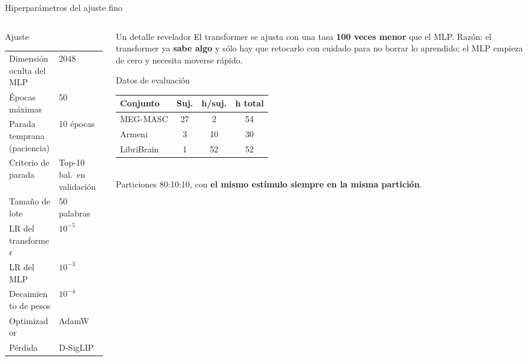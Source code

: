 \documentclass[aspectratio=169,10pt]{beamer}
\newcommand{\term}[1]{\textbf{\color{deepgreen}#1}}
\begin{document}
\begin{frame}[c]{Hiperparámetros del ajuste fino}
  \small
  \begin{columns}[c,totalwidth=\linewidth]
    \begin{column}{0.48\linewidth}
      \begin{block}{Ajuste}
        \footnotesize
        \begin{tabular}{@{}ll@{}}
          \toprule
          Dimensión oculta del MLP & 2048 \\
          Épocas máximas & 50 \\
          Parada temprana (paciencia) & 10 épocas \\
          Criterio de parada & Top-10 bal.\ en validación \\
          Tamaño de lote & 50 palabras \\
          LR del transformer & $10^{-5}$ \\
          LR del MLP & $10^{-3}$ \\
          Decaimiento de pesos & $10^{-4}$ \\
          Optimizador & AdamW \\
          Pérdida & D-SigLIP \\
          \bottomrule
        \end{tabular}
      \end{block}
    \end{column}
    \begin{column}{0.48\linewidth}
      \begin{exampleblock}{Un detalle revelador}
        El transformer se ajusta con una tasa \term{100 veces menor} que el MLP.
        \vspace{1.5mm}
        Razón: el transformer ya \term{sabe algo} y sólo hay que retocarlo con cuidado para no borrar lo aprendido; el MLP empieza de cero y necesita moverse rápido.
      \end{exampleblock}
      \vspace{1mm}
      \begin{block}{Datos de evaluación}
        \footnotesize
        \begin{tabular}{@{}lccc@{}}
          \toprule
          Conjunto & Suj. & h/suj. & h total \\
          \midrule
          MEG-MASC & 27 & 2 & 54 \\
          Armeni & 3 & 10 & 30 \\
          LibriBrain & 1 & 52 & 52 \\
          \bottomrule
        \end{tabular}
        \vspace{1mm}
        \\ Particiones 80:10:10, con \term{el mismo estímulo siempre en la misma partición}.
      \end{block}
    \end{column}
  \end{columns}
\end{frame}
\end{document}
